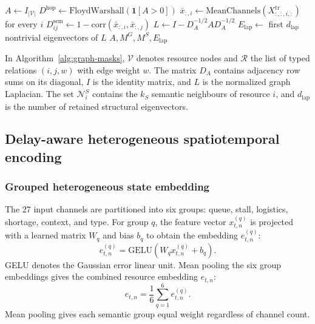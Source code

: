 \documentclass[a4paper,fleqn]{cas-dc}
\begin{document}
\begin{algorithm}[t]
\caption{Factory graph and attention-mask construction.}
\label{alg:graph-masks}
$A\leftarrow I_{|\mathcal{V}|}$\;
$D^{\mathrm{hop}}\leftarrow\mathrm{FloydWarshall}(\mathbf{1}[A>0])$\;
$\bar x_{:,i}\leftarrow\mathrm{MeanChannels}(X^{\mathrm{tr}}_{:,:,i,:})$ for every $i$\;
$D^{\mathrm{sem}}_{ij}\leftarrow1-\mathrm{corr}(\bar x_{:,i},\bar x_{:,j})$\;
$L\leftarrow I-D_A^{-1/2}AD_A^{-1/2}$\;
$E_{\mathrm{lap}}\leftarrow$ first $d_{\mathrm{lap}}$ nontrivial eigenvectors of $L$\;
\Return $A,M^G,M^S,E_{\mathrm{lap}}$\;
\end{algorithm}

In Algorithm~\ref{alg:graph-masks}, $\mathcal{V}$ denotes resource nodes and $\mathcal{R}$ the list of typed relations $(i,j,w)$ with edge weight $w$. The matrix $D_A$ contains adjacency row sums on its diagonal, $I$ is the identity matrix, and $L$ is the normalized graph Laplacian. The set $\mathcal{N}^{S}_i$ contains the $k_S$ semantic neighbours of resource $i$, and $d_{\mathrm{lap}}$ is the number of retained structural eigenvectors.

\subsection{Delay-aware heterogeneous spatiotemporal encoding}



\subsubsection{Grouped heterogeneous state embedding}

The 27 input channels are partitioned into six groups: queue, stall, logistics, shortage, context, and type. For group $q$, the feature vector $x^{(q)}_{t,n}$ is projected with a learned matrix $W_q$ and bias $b_q$ to obtain the embedding $e^{(q)}_{t,n}$:
\begin{equation}
e^{(q)}_{t,n}=\mathrm{GELU}
\left(W_q x^{(q)}_{t,n}+b_q\right).
\end{equation}
GELU denotes the Gaussian error linear unit. Mean pooling the six group embeddings gives the combined resource embedding $e_{t,n}$:
\begin{equation}
e_{t,n}=\frac{1}{6}\sum_{q=1}^{6}e^{(q)}_{t,n}.
\end{equation}
Mean pooling gives each semantic group equal weight regardless of channel count.
\end{document}
